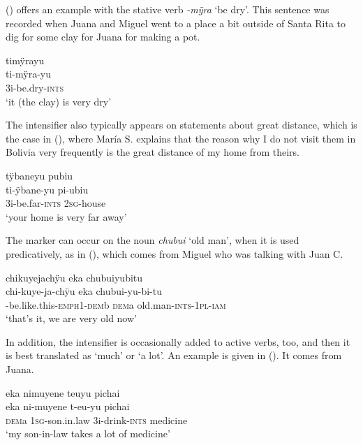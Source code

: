 () offers an example with the stative verb \textit{-mÿra} ‘be dry’. This sentence was recorded when Juana and Miguel went to a place a bit outside of Santa Rita to dig for some clay for Juana for making a pot.

\ea\label{ex:yu-STAT}
\begingl
\glpreamble timÿrayu\\
\gla ti-mÿra-yu\\
\glb 3i-be.dry-\textsc{ints}\\
\glft ‘it (the clay) is very dry’
\endgl
\trailingcitation{[jmx-d110918ls-1.032]}
\xe

The intensifier also typically appears on statements about great distance, which is the case in (), where María S. explains that the reason why I do not visit them in Bolivia very frequently is the great distance of my home from theirs.

\ea\label{ex:yu-far}
\begingl
\glpreamble tÿbaneyu pubiu\\
\gla ti-ÿbane-yu pi-ubiu\\
\glb 3i-be.far-\textsc{ints} 2\textsc{sg}-house\\
\glft ‘your home is very far away’
\endgl
\trailingcitation{[rxx-e120511l.214]}
\xe



The marker can occur on the noun \textit{chubui} ‘old man’, when it is used predicatively, as in (), which comes from Miguel who was talking with Juan C.

\ea\label{ex:chubuiyu}
\begingl
\glpreamble chikuyejachÿu eka chubuiyubitu\\
\gla chi-kuye-ja-chÿu eka chubui-yu-bi-tu\\
-be.like.this-\textsc{emph}1-\textsc{dem}b \textsc{dem}a old.man-\textsc{ints}-1\textsc{pl}-\textsc{iam}\\
\glft ‘that’s it, we are very old now’
\endgl
\trailingcitation{[mqx-p110826l.343]}
\xe

In addition, the intensifier is occasionally added to active verbs, too, and then it is best translated as ‘much’ or ‘a lot’. An example is given in (). It comes from Juana.

\ea\label{ex:yu-ACT}
\begingl
\glpreamble eka nimuyene teuyu pichai\\
\gla eka ni-muyene t-eu-yu pichai\\
\glb \textsc{dem}a 1\textsc{sg}-son.in.law 3i-drink-\textsc{ints} medicine\\
\glft ‘my son-in-law takes a lot of medicine’
\endgl
\trailingcitation{[jxx-p110923l-1.050]}
\xe

